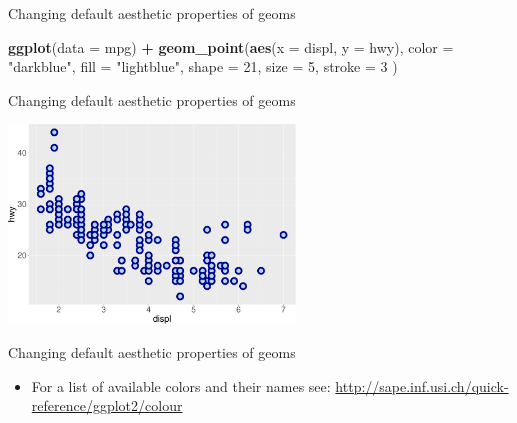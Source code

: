 \documentclass[ignorenonframetext,]{beamer}
\newenvironment{Shaded}{\begin{snugshade}}{\end{snugshade}}
\newcommand{\DataTypeTok}[1]{\textcolor[rgb]{0.13,0.29,0.53}{#1}}
\newcommand{\DecValTok}[1]{\textcolor[rgb]{0.00,0.00,0.81}{#1}}
\newcommand{\KeywordTok}[1]{\textcolor[rgb]{0.13,0.29,0.53}{\textbf{#1}}}
\newcommand{\NormalTok}[1]{#1}
\newcommand{\OperatorTok}[1]{\textcolor[rgb]{0.81,0.36,0.00}{\textbf{#1}}}
\newcommand{\StringTok}[1]{\textcolor[rgb]{0.31,0.60,0.02}{#1}}
\providecommand{\tightlist}{%
  \setlength{\itemsep}{0pt}\setlength{\parskip}{0pt}}
\begin{document}
\begin{frame}[fragile]{Changing default aesthetic properties of geoms}
\protect\hypertarget{changing-default-aesthetic-properties-of-geoms-14}{}

\begin{Shaded}
\begin{Highlighting}[]
\KeywordTok{ggplot}\NormalTok{(}\DataTypeTok{data =}\NormalTok{ mpg) }\OperatorTok{+}
\StringTok{  }\KeywordTok{geom_point}\NormalTok{(}\KeywordTok{aes}\NormalTok{(}\DataTypeTok{x =}\NormalTok{ displ, }\DataTypeTok{y =}\NormalTok{ hwy),}
    \DataTypeTok{color =} \StringTok{"darkblue"}\NormalTok{,}
    \DataTypeTok{fill =} \StringTok{"lightblue"}\NormalTok{,}
    \DataTypeTok{shape =} \DecValTok{21}\NormalTok{,}
    \DataTypeTok{size =} \DecValTok{5}\NormalTok{,}
    \DataTypeTok{stroke =} \DecValTok{3}
\NormalTok{  )}
\end{Highlighting}
\end{Shaded}

\end{frame}

\begin{frame}{Changing default aesthetic properties of geoms}
\protect\hypertarget{changing-default-aesthetic-properties-of-geoms-15}{}

\begin{center}\includegraphics[height=200px]{data-visualization_files/figure-beamer/unnamed-chunk-51-1} \end{center}

\end{frame}

\begin{frame}{Changing default aesthetic properties of geoms}
\protect\hypertarget{changing-default-aesthetic-properties-of-geoms-16}{}

\begin{itemize}
\tightlist
\item
  For a list of available colors and their names see:
  \url{http://sape.inf.usi.ch/quick-reference/ggplot2/colour}
\end{itemize}

\end{frame}
\end{document}
